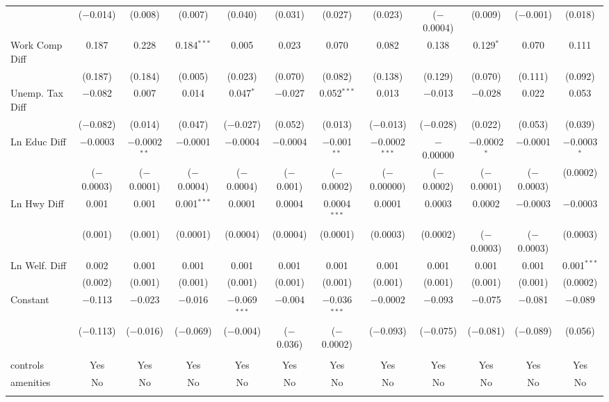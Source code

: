 \begin{table}[!htbp]
\begin{tabular}{@{\extracolsep{5pt}}lccccccccccc}
  & ($-$0.014) & (0.008) & (0.007) & (0.040) & (0.031) & (0.027) & (0.023) & ($-$0.0004) & (0.009) & ($-$0.001) & (0.018) \\ 
  Work Comp Diff & 0.187 & 0.228 & 0.184$^{***}$ & 0.005 & 0.023 & 0.070 & 0.082 & 0.138 & 0.129$^{*}$ & 0.070 & 0.111 \\ 
  & (0.187) & (0.184) & (0.005) & (0.023) & (0.070) & (0.082) & (0.138) & (0.129) & (0.070) & (0.111) & (0.092) \\ 
  Unemp. Tax Diff & $-$0.082 & 0.007 & 0.014 & 0.047$^{*}$ & $-$0.027 & 0.052$^{***}$ & 0.013 & $-$0.013 & $-$0.028 & 0.022 & 0.053 \\ 
  & ($-$0.082) & (0.014) & (0.047) & ($-$0.027) & (0.052) & (0.013) & ($-$0.013) & ($-$0.028) & (0.022) & (0.053) & (0.039) \\ 
  Ln Educ Diff & $-$0.0003 & $-$0.0002$^{**}$ & $-$0.0001 & $-$0.0004 & $-$0.0004 & $-$0.001$^{**}$ & $-$0.0002$^{***}$ & $-$0.00000 & $-$0.0002$^{*}$ & $-$0.0001 & $-$0.0003$^{*}$ \\ 
  & ($-$0.0003) & ($-$0.0001) & ($-$0.0004) & ($-$0.0004) & ($-$0.001) & ($-$0.0002) & ($-$0.00000) & ($-$0.0002) & ($-$0.0001) & ($-$0.0003) & (0.0002) \\ 
  Ln Hwy Diff & 0.001 & 0.001 & 0.001$^{***}$ & 0.0001 & 0.0004 & 0.0004$^{***}$ & 0.0001 & 0.0003 & 0.0002 & $-$0.0003 & $-$0.0003 \\ 
  & (0.001) & (0.001) & (0.0001) & (0.0004) & (0.0004) & (0.0001) & (0.0003) & (0.0002) & ($-$0.0003) & ($-$0.0003) & (0.0003) \\ 
  Ln Welf. Diff & 0.002 & 0.001 & 0.001 & 0.001 & 0.001 & 0.001 & 0.001 & 0.001 & 0.001 & 0.001 & 0.001$^{***}$ \\ 
  & (0.002) & (0.001) & (0.001) & (0.001) & (0.001) & (0.001) & (0.001) & (0.001) & (0.001) & (0.001) & (0.0002) \\ 
  Constant & $-$0.113 & $-$0.023 & $-$0.016 & $-$0.069$^{***}$ & $-$0.004 & $-$0.036$^{***}$ & $-$0.0002 & $-$0.093 & $-$0.075 & $-$0.081 & $-$0.089 \\ 
  & ($-$0.113) & ($-$0.016) & ($-$0.069) & ($-$0.004) & ($-$0.036) & ($-$0.0002) & ($-$0.093) & ($-$0.075) & ($-$0.081) & ($-$0.089) & (0.056) \\ 
 \hline \\[-1.8ex] 
controls & Yes & Yes & Yes & Yes & Yes & Yes & Yes & Yes & Yes & Yes & Yes \\ 
amenities & No & No & No & No & No & No & No & No & No & No & No \\ 
\hline \\[-1.8ex] 

\end{tabular}
\end{table}
